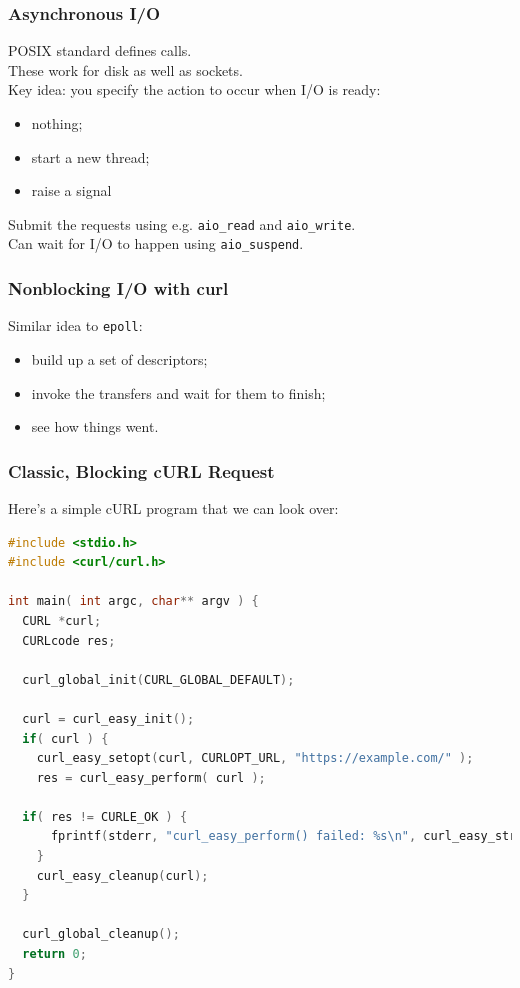 \begin{frame}
  \frametitle{Asynchronous I/O}
  
    POSIX standard defines  calls.\\[1em]

    These work for disk as well as sockets.\\[1em]

    Key idea: you specify the action to occur when I/O is ready:
    \begin{itemize}
      \item nothing;
      \item start a new thread;
      \item raise a signal
    \end{itemize}

    Submit the requests using e.g. {\tt aio\_read} and {\tt aio\_write}.\\[1em]
    Can wait for I/O to happen using {\tt aio\_suspend}.
  
\end{frame}

\begin{frame}
  \frametitle{Nonblocking I/O with curl}
  
    Similar idea to {\tt epoll}:
\begin{itemize}
\item build up a set of descriptors;
\item invoke the transfers and wait for them to finish;
\item see how things went.
\end{itemize}
  
\end{frame}


\begin{frame}[fragile]
\frametitle{Classic, Blocking cURL Request}

Here's a simple cURL program that we can look over:

\begin{lstlisting}[language=C]
#include <stdio.h>
#include <curl/curl.h>
 
int main( int argc, char** argv ) {
  CURL *curl;
  CURLcode res;
 
  curl_global_init(CURL_GLOBAL_DEFAULT);
 
  curl = curl_easy_init();
  if( curl ) {
    curl_easy_setopt(curl, CURLOPT_URL, "https://example.com/" );
    res = curl_easy_perform( curl );
    
  if( res != CURLE_OK ) {
      fprintf(stderr, "curl_easy_perform() failed: %s\n", curl_easy_strerror(res));
    }
    curl_easy_cleanup(curl);
  }
 
  curl_global_cleanup();
  return 0;
}
\end{lstlisting}


\end{frame}



